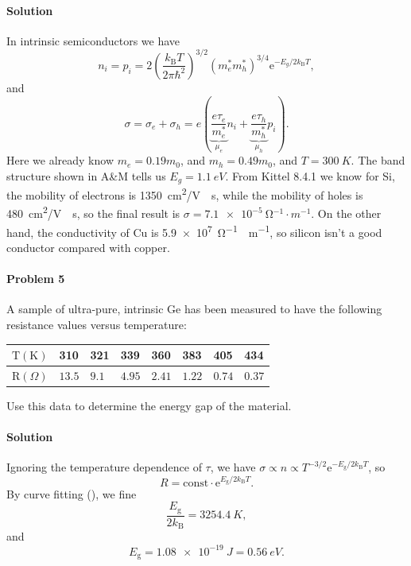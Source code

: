 \documentclass[hyperref, a4paper]{article}
\newcommand*{\ee}{\mathrm{e}}
\newcommand*{\const}{\mathrm{const}}
\begin{document}
\paragraph{Solution} In intrinsic semiconductors we have
\begin{equation}
    n_i = p_i = 2 \left( \frac{k_{\text{B}} T}{2 \pi \hbar^2} \right)^{3/2} (m_e^* m_h^*)^{3/4} \ee^{- E_g / 2 k_{\text{B}} T}, 
\end{equation}
and 
\begin{equation}
    \sigma = \sigma_e + \sigma_h = e \left( 
        \underbrace{\frac{e \tau_e}{m_e^*}}_{\mu_e} n_i
        + \underbrace{\frac{e \tau_h}{m_h^*}}_{\mu_h} p_i
    \right).
\end{equation}
Here we already know $m_e = 0.19 m_0$, and $m_h = 0.49 m_0$,
and $T = \SI{300}{K}$.
The band structure shown in A\&M tells us $E_g = \SI{1.1}{eV}$.
From Kittel 8.4.1 we know for Si,
the mobility of electrons is \SI{1350}{cm^2/V\cdot s},
while the mobility of holes is \SI{480}{cm^2/V\cdot s},
so the final result is $\sigma = \SI{7.1e-5}{\ohm^{-1} \cdot m^{-1}}$.
On the other hand, the conductivity of Cu is \SI{5.9e7}{\ohm^{-1} \cdot m^{-1}},
so silicon isn't a good conductor compared with copper.

\paragraph{Problem 5} A sample of ultra-pure, intrinsic Ge has been measured to have the following resistance values versus temperature:
\begin{center}
    \begin{tabular}{|l|l|l|l|l|l|l|l|}
        \hline $\mathrm{T}(\mathrm{K})$ & 310 & 321 & 339 & 360 & 383 & 405 & 434 \\
        \hline $\mathrm{R}(\Omega)$ & $13.5$ & $9.1$ & $4.95$ & $2.41$ & $1.22$ & $0.74$ & $0.37$ \\
        \hline
        \end{tabular}
\end{center}
Use this data to determine the energy gap of the material.

\paragraph{Solution} Ignoring the temperature dependence of $\tau$,
we have $\sigma \propto n \propto T^{-3/2} \ee^{- E_\text{g} / 2 k_{\text{B}} T}$,
so 
\begin{equation}
    R = \const \cdot \ee^{E_{\text{g}} / 2 k_{\text{B}} T}.
\end{equation}
By curve fitting (), we fine 
\[
    \frac{E_{\text{g}}}{2 k_{\text{B}}} = \SI{3254.4}{K},
\]
and 
\begin{equation}
    E_{\text{g}} = \SI{1.08e-19}{J} = \SI{0.56}{eV}.
\end{equation}
\end{document}
